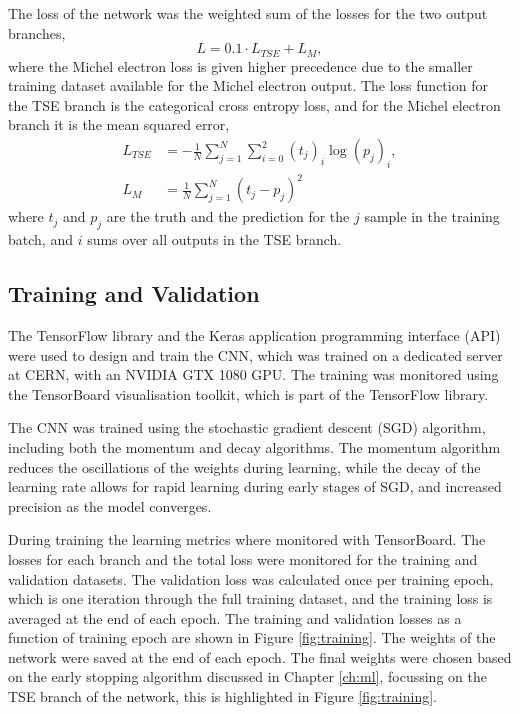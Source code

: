 The loss of the network was the weighted sum of the losses for the two output
branches,
\begin{equation*}
	L = 0.1 \cdot L_{TSE} + L_M,
\end{equation*}
where the Michel electron loss is given higher precedence due to the smaller
training dataset available for the Michel electron output. The loss function for
the TSE branch is the categorical cross entropy 
loss\cite{750fabedbacb467c8fafd98b87f77436}, and for the Michel electron branch
it is the mean squared error\cite{mse_springer},
\begin{align*}
	L_{TSE} &= - \frac{1}{N} \sum_{j=1}^N \sum_{i=0}^2 (t_j)_i \log (p_j)_i, \\
	L_M &= \frac{1}{N} \sum_{j=1}^N (t_j - p_j)^2
\end{align*}
where $t_j$ and $p_j$ are the truth and the prediction for the $j$ sample in the
training batch, and $i$ sums over all outputs in the TSE branch.

\subsection{Training and Validation}

The TensorFlow\cite{45381} library and the Keras\cite{chollet2015keras} 
application programming interface (API) were used to design and train the CNN, 
which was trained on a dedicated \protodune{} server at CERN, with an NVIDIA 
GTX 1080 GPU. The training was monitored using the TensorBoard visualisation 
toolkit, which is part of the TensorFlow library. 

The CNN was trained using the stochastic gradient descent (SGD)
algorithm, including both the momentum and decay 
algorithms\cite{Reed1999}. The momentum algorithm reduces the oscillations of
the weights during learning, while the decay of the learning rate allows for
rapid learning during early stages of SGD, and increased precision as the model
converges. 

During training the learning metrics where monitored with TensorBoard. The
losses for each branch and the total loss were monitored for the training
and validation datasets. The validation loss was calculated once per training
epoch, which is one iteration through the full training dataset, and the
training loss is averaged at the end of each epoch. The training and validation
losses as a function of training epoch are shown in Figure \ref{fig:training}.
The weights of the network were saved at the end of each epoch. The final
weights were chosen based on the early stopping algorithm discussed in Chapter
\ref{ch:ml}, focussing on the TSE branch of the network, this is highlighted 
in Figure \ref{fig:training}.

